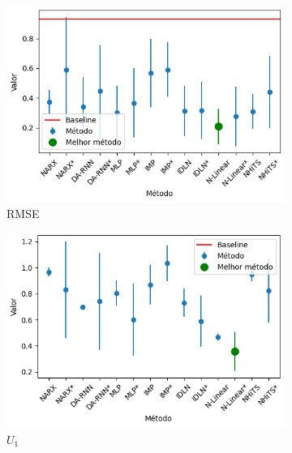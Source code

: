 \begin{figure}[htbp]
	\begin{subfigure}[b]{0.3\textwidth}
		\centering
		\includegraphics[width=\textwidth]{figuras/rmse_brasil_results.png}
		\caption{\ac{RMSE}}
		\label{fig:rmse_brasil_results}
	\end{subfigure}
	\hfill
	\begin{subfigure}[b]{0.3\textwidth}
		\centering
		\includegraphics[width=\textwidth]{figuras/u1_brasil_results.png}
		\caption{\(U_1\)}
		\label{fig:u1_brasil_results}
	\end{subfigure}
	\hfill
	\begin{subfigure}[b]{0.3\textwidth}
		\centering

\end{subfigure}
\end{figure}
